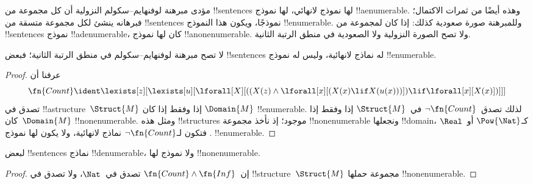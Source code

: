 \documentclass[../../../include/open-logic-section]{subfiles}
\begin{document}


\begin{explain}
مؤدى مبرهنة لوفنهايم--سكولم النزولية أن كل مجموعة من
!!{sentence}s لها نموذج لانهائي، لها نموذج !!a{enumerable}.
وهذه أيضًا من ثمرات الاكتمال؛ فبرهانه ينشئ لكل مجموعة متسقة
من !!{sentence}s نموذجًا، ويكون هذا النموذج !!{enumerable}.
وللمبرهنة صورة صعودية كذلك: إذا كان لمجموعة من !!{sentence}s
نموذج !!a{denumerable}، كان لها نموذج !!a{nonenumerable}.
ولا تصح الصورة النزولية ولا الصعودية في منطق الرتبة الثانية.
\end{explain}

\begin{thm}
 لا تصح مبرهنة لوفنهايم--سكولم في
منطق الرتبة الثانية؛ فبعض !!{sentence}s له نماذج لانهائية،
وليس له نموذج !!{enumerable}.
\end{thm}

\begin{proof}
عرفنا أن
\[
\fn{Count} \ident \lexists[z][\lexists[u][\lforall[X][((X(z) \land
      \lforall[x][(X(x) \lif X(u(x)))]) \lif \lforall[x][X(x)])]]]
\]
تصدق في !!a{structure}~$\Struct{M}$ إذا وفقط إذا كان
$\Domain{M}$ !!{enumerable}. لذلك تصدق~$\lnot\fn{Count}$
في~$\Struct{M}$ إذا وفقط إذا كان~$\Domain{M}$ !!{nonenumerable}.
ومثل هذه !!{structure}s موجود؛ إذ نأخذ مجموعة !!{nonenumerable}
ونجعلها !!{domain}، كـ$\Pow{\Nat}$ أو~$\Real$.
فتكون لـ$\lnot \fn{Count}$ نماذج لانهائية، ولا يكون لها
نموذج !!{enumerable}.
\end{proof}

\begin{thm}
لبعض !!{sentence}s نماذج !!{denumerable}، ولا نموذج لها
!!{nonenumerable}.
\end{thm}

\begin{proof}
إن~$\fn{Count} \land \fn{Inf}$ تصدق في~$\Nat$، ولا تصدق
في !!{structure}~$\Struct{M}$ مجموعة حملها !!{nonenumerable}.
\end{proof}
\end{document}
